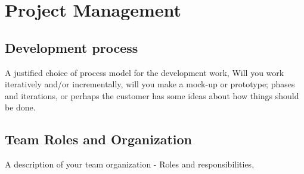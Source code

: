 \chapter{Project Management}
\section{Development process}
A justified choice of process model for the development work,
 Will you work iteratively and/or incrementally, will you make a
mock-up or prototype; phases and iterations, or perhaps the customer has some ideas about how things should be done.
\section{Team Roles and Organization}
A description of your team organization - Roles and responsibilities,
 
